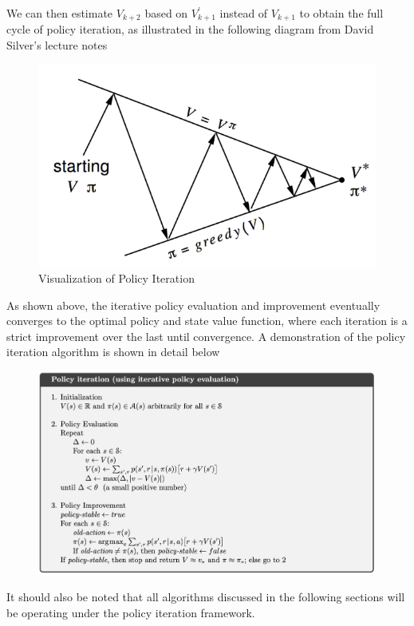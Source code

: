 \documentclass[12pt]{report}
\begin{document}
We can then estimate $V_{k+2}$ based on $V_{k+1}^\prime$ instead of $V_{k+1}$ to obtain the full cycle of policy iteration, as illustrated in the following diagram from David Silver's lecture notes \cite{silver2015}
\begin{figure}[H]
    \center
    \includegraphics[width=0.45\linewidth]{figs/policy-iter.png}
    \caption{Visualization of Policy Iteration}
    \label{fig:policy-iter}
\end{figure}
As shown above, the iterative policy evaluation and improvement eventually converges to the optimal policy and state value function, where each iteration is a strict improvement over the last until convergence. A demonstration \cite{sutton2018reinforcement} of the policy iteration algorithm is shown in detail below
\begin{figure}[H]
    \center
    \includegraphics[width=0.8\linewidth]{figs/policy-iter-code.png}
    \label{fig:policy-iter-code}
\end{figure}
It should also be noted that all algorithms discussed in the following sections will be operating under the policy iteration framework.
\end{document}
